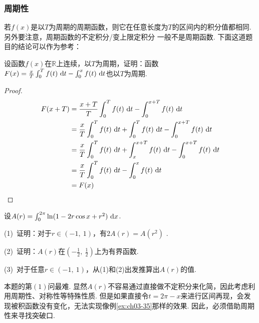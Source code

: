 \subsubsection{周期性}\par

若$f(x)$是以$T$为周期的周期函数，则它在任意长度为$T$的区间内的积分值都相同. 另外要注意，周期函数的不定积分/变上限定积分
一般不是周期函数. 下面这道题目的结论可以作为参考：

\begin{example}
\label{ex:ch03-37}
设函数$f(x)$在$\mathbb{R}$上连续，以$T$为周期，证明：函数$F(x) = \frac{x}{T}\int_{0}^{T}f(t)~\mathrm{d} t - \int_{0}^{x}f(t) ~\mathrm{d} t$也以$T$为周期.
\end{example}

\begin{proof}
\begin{equation}
    \begin{aligned}
        F(x+T)
        &= \frac{x+T}{T}\int_{0}^{T}f(t)~\mathrm{d} t - \int_{0}^{x+T}f(t) ~\mathrm{d} t \\
        &= \frac{x}{T}\int_{0}^{T}f(t)~\mathrm{d} t + \int_{0}^{T}f(t)~\mathrm{d} t - \int_{0}^{x+T}f(t) ~\mathrm{d} t \\
        &= \frac{x}{T}\int_{0}^{T}f(t)~\mathrm{d} t + \int_{x}^{x+T}f(t)~\mathrm{d} t - \int_{0}^{x+T}f(t) ~\mathrm{d} t \\
        &= \frac{x}{T}\int_{0}^{T}f(t)~\mathrm{d} t - \int_{0}^{x} f(t) ~\mathrm{d} t \\
        &= F(x)
        \nonumber
    \end{aligned}
\end{equation}
\end{proof}

\begin{example}
\label{ex:ch03-38}
设$A(r) = \int_{0}^{2\pi} \ln ( 1- 2r \cos x +r^2) ~\mathrm{d} x $. \par
(1)~证明：对于$r\in (-1,~1)$，有$2A(r) = A(r^2)$ . \par
(2)~证明：$A(r)$在$\left( -\frac{1}{2},~\frac{1}{2}\right)$上为有界函数. \par
(3)~对于任意$r\in (-1,~1)$，从(1)和(2)出发推算出$A(r)$的值.
\end{example}

\begin{analysis}
本题的第$(1)$问最难.
显然$A(r)$不容易通过直接做不定积分来化简，因此考虑利用周期性、对称性等特殊性质.
但是如果直接令$t = 2\pi -x$来进行区间再现，会发现被积函数没有变化，无法实现像例\ref{ex:ch03-35}那样的效果.
因此，必须借助周期性来寻找突破口.
\end{analysis}

